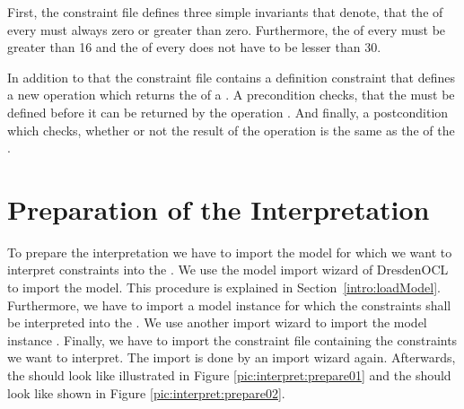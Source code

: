 First, the constraint file defines three simple invariants that denote, that the  of every  must always zero or greater than zero. Furthermore, the  of every  must be greater than 16 and the   of every  does not have to be lesser than 30.

In addition to that the constraint file contains a definition constraint that defines a new operation  which returns the  of a . A precondition checks, that the  must be defined before it can be returned by the operation . And finally, a postcondition which checks, whether or not the result of the operation  is the same as the  of the .



\section{Preparation of the Interpretation}

To prepare the interpretation we have to import the model  for which we want to interpret constraints into the . We use the model import wizard of DresdenOCL to import the model. This procedure is explained in Section~\ref{intro:loadModel}. Furthermore, we have to import a model instance for which the constraints shall be interpreted into the . We use another import wizard to import the model instance . Finally, we have to import the constraint file  containing the constraints we want to interpret. The import is done by an import wizard again. Afterwards, the  should look like illustrated in Figure \ref{pic:interpret:prepare01} and the  should look like shown in Figure \ref{pic:interpret:prepare02}.

